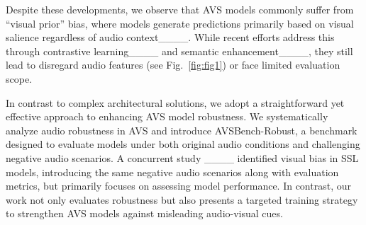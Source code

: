 
Despite these developments, we observe that AVS models commonly suffer from ``visual prior'' bias, where models generate predictions primarily based on visual salience regardless of audio context____. While recent efforts address this through contrastive learning____ and semantic enhancement____, they still lead to disregard audio features (see Fig.~\ref{fig:fig1}) or face limited evaluation scope. 

In contrast to complex architectural solutions, we adopt a straightforward yet effective approach to enhancing AVS model robustness. We systematically analyze audio robustness in AVS and introduce AVSBench-Robust, a benchmark designed to evaluate models under both original audio conditions and challenging negative audio scenarios. 
A concurrent study ____ identified visual bias in SSL models, introducing the same negative audio scenarios along with evaluation metrics, but primarily focuses on assessing model performance.
In contrast, our work not only evaluates robustness but also presents a targeted training strategy to strengthen AVS models against misleading audio-visual cues.

